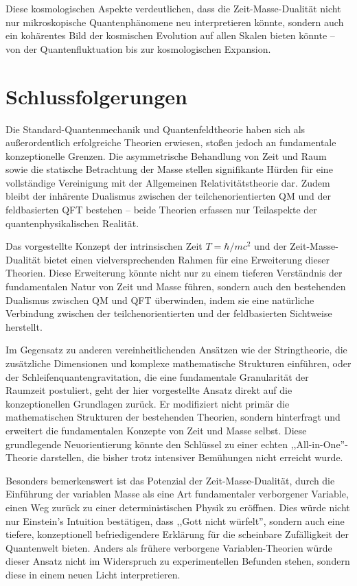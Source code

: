 \documentclass[12pt,a4paper]{article}  %
\begin{document}
		Diese kosmologischen Aspekte verdeutlichen, dass die Zeit-Masse-Dualität nicht nur mikroskopische Quantenphänomene neu interpretieren könnte, sondern auch ein kohärentes Bild der kosmischen Evolution auf allen Skalen bieten könnte – von der Quantenfluktuation bis zur kosmologischen Expansion.
		
		\section{Schlussfolgerungen}
		
		Die Standard-Quantenmechanik und Quantenfeldtheorie haben sich als außerordentlich erfolgreiche Theorien erwiesen, stoßen jedoch an fundamentale konzeptionelle Grenzen. Die asymmetrische Behandlung von Zeit und Raum sowie die statische Betrachtung der Masse stellen signifikante Hürden für eine vollständige Vereinigung mit der Allgemeinen Relativitätstheorie dar. Zudem bleibt der inhärente Dualismus zwischen der teilchenorientierten QM und der feldbasierten QFT bestehen – beide Theorien erfassen nur Teilaspekte der quantenphysikalischen Realität.
		
		Das vorgestellte Konzept der intrinsischen Zeit $T = \hbar/mc^2$ und der Zeit-Masse-Dualität bietet einen vielversprechenden Rahmen für eine Erweiterung dieser Theorien. Diese Erweiterung könnte nicht nur zu einem tieferen Verständnis der fundamentalen Natur von Zeit und Masse führen, sondern auch den bestehenden Dualismus zwischen QM und QFT überwinden, indem sie eine natürliche Verbindung zwischen der teilchenorientierten und der feldbasierten Sichtweise herstellt. 
		
		Im Gegensatz zu anderen vereinheitlichenden Ansätzen wie der Stringtheorie, die zusätzliche Dimensionen und komplexe mathematische Strukturen einführen, oder der Schleifenquantengravitation, die eine fundamentale Granularität der Raumzeit postuliert, geht der hier vorgestellte Ansatz direkt auf die konzeptionellen Grundlagen zurück. Er modifiziert nicht primär die mathematischen Strukturen der bestehenden Theorien, sondern hinterfragt und erweitert die fundamentalen Konzepte von Zeit und Masse selbst. Diese grundlegende Neuorientierung könnte den Schlüssel zu einer echten ,,All-in-One''-Theorie darstellen, die bisher trotz intensiver Bemühungen nicht erreicht wurde.
		
		Besonders bemerkenswert ist das Potenzial der Zeit-Masse-Dualität, durch die Einführung der variablen Masse als eine Art fundamentaler verborgener Variable, einen Weg zurück zu einer deterministischen Physik zu eröffnen. Dies würde nicht nur Einstein's Intuition bestätigen, dass ,,Gott nicht würfelt'', sondern auch eine tiefere, konzeptionell befriedigendere Erklärung für die scheinbare Zufälligkeit der Quantenwelt bieten. Anders als frühere verborgene Variablen-Theorien würde dieser Ansatz nicht im Widerspruch zu experimentellen Befunden stehen, sondern diese in einem neuen Licht interpretieren.
		
\end{document}
